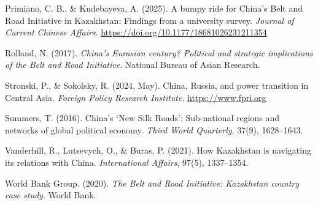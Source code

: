 \documentclass[12pt]{article}
\begin{document}
\begin{flushleft}
Primiano, C. B., \& Kudebayeva, A. (2025). A bumpy ride for China's Belt and Road Initiative in Kazakhstan: Findings from a university survey. \textit{Journal of Current Chinese Affairs}. \url{https://doi.org/10.1177/18681026231211354}

Rolland, N. (2017). \textit{China's Eurasian century? Political and strategic implications of the Belt and Road Initiative}. National Bureau of Asian Research.

Stronski, P., \& Sokolsky, R. (2024, May). China, Russia, and power transition in Central Asia. \textit{Foreign Policy Research Institute}. \url{https://www.fpri.org}

Summers, T. (2016). China's `New Silk Roads': Sub-national regions and networks of global political economy. \textit{Third World Quarterly}, 37(9), 1628--1643.

Vanderhill, R., Lutsevych, O., \& Buras, P. (2021). How Kazakhstan is navigating its relations with China. \textit{International Affairs}, 97(5), 1337--1354.

World Bank Group. (2020). \textit{The Belt and Road Initiative: Kazakhstan country case study}. World Bank.
\end{flushleft}
\end{document}
